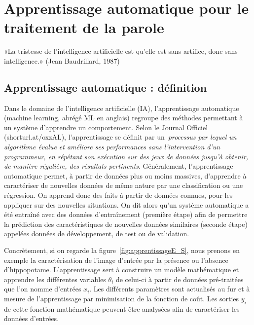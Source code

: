 \chapter{Apprentissage automatique pour le traitement de la parole}
\label{chapitre2}
«La tristesse de l'intelligence artificielle est qu'elle est sans artifice, donc sans intelligence.»  (Jean Baudrillard, 1987)

\section{Apprentissage automatique : définition}

Dans le domaine de l'intelligence artificielle (IA), l'apprentissage automatique (machine learning, abrégé ML en anglais) regroupe des méthodes permettant à un système d'apprendre un comportement. Selon le Journal Officiel (shorturl.at/oxzAL), l'apprentissage se définit par un~\textit{processus par lequel un algorithme évalue et améliore ses performances sans l'intervention d'un programmeur, en répétant son exécution sur des jeux de données jusqu'à obtenir, de manière régulière, des résultats pertinents}. Généralement, l'apprentissage automatique permet, à partir de données plus ou moins massives, d'apprendre à caractériser de nouvelles données de même nature par une classification ou une régression. On apprend donc des faits à partir de données connues, pour les appliquer sur des nouvelles situations. On dit alors qu'un système automatique a été entraîné avec des données d’entraînement (première étape) afin de permettre la prédiction des caractéristiques de nouvelles données similaires (seconde étape) appelées données de développement, de test ou de validation.



Concrètement, si on regarde la figure~\ref{fig:apprentissageE_S}, nous prenons en exemple la caractérisation de l'image d'entrée par la présence ou l'absence d'hippopotame. L'apprentissage sert à construire un modèle mathématique et apprendre les différentes variables $\theta_i$ de celui-ci à partir de données pré-traitées que l'on nomme d'entrées $x_i$. Les différents paramètres sont actualisés au fur et à mesure de l'apprentissage par minimisation de la fonction de coût. Les sorties $y_i$ de cette fonction mathématique peuvent être analysées afin de caractériser les données d'entrées.

